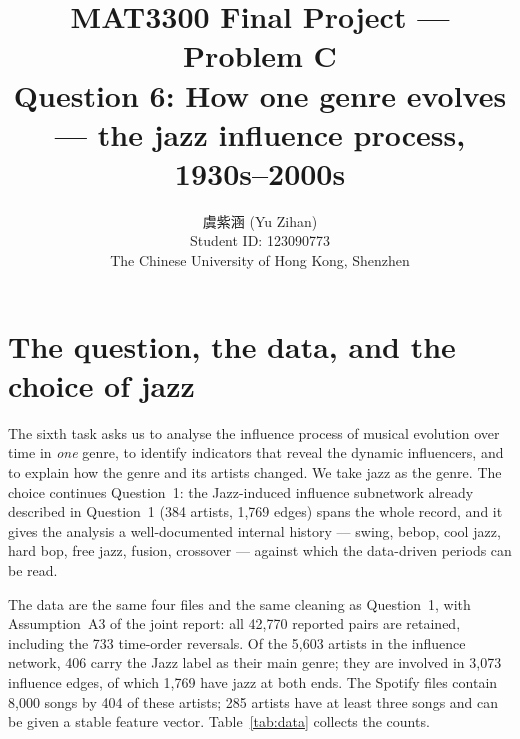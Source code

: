 \documentclass[11pt]{article}
\title{MAT3300 Final Project --- Problem C\\[2pt]
\large Question 6: How one genre evolves --- the jazz influence process, 1930s--2000s}
\author{虞紫涵 (Yu Zihan)\\Student ID: 123090773\\The Chinese University of Hong Kong, Shenzhen}
\date{}
\begin{document}
\maketitle

\section{The question, the data, and the choice of jazz}
The sixth task asks us to analyse the influence process of musical evolution over time in
\emph{one} genre, to identify indicators that reveal the dynamic influencers, and to explain how
the genre and its artists changed. We take jazz as the genre. The choice continues Question~1:
the Jazz-induced influence subnetwork already described in Question~1
(384 artists, 1,769 edges) spans the whole record, and it gives
the analysis a well-documented internal history --- swing, bebop, cool jazz, hard bop, free jazz,
fusion, crossover --- against which the data-driven periods can be read.

The data are the same four files and the same cleaning as Question~1, with Assumption~A3 of the
joint report: all 42,770 reported pairs are retained, including the 733 time-order reversals.
Of the 5,603 artists in the influence network, 406 carry the Jazz label as
their main genre; they are involved in 3,073 influence edges, of which
1,769 have jazz at both ends.
The Spotify files contain 8,000 songs by 404 of these artists; 285
artists have at least three songs and can be given a stable feature vector.
Table~\ref{tab:data} collects the counts.
\end{document}
